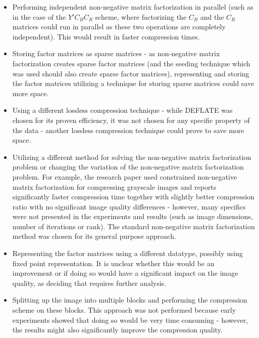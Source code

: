 \documentclass[thesis=M,english]{FITthesis}[2012/10/20]
\begin{document}
\begin{itemize}
  \item Performing independent non-negative matrix factorization in parallel
  (such as in the case of the $Y'C_BC_R$ scheme, where factorizing the $C_B$
  and the $C_R$ matrices could run in parallel as these two operations are
  completely independent). This would result in faster compression times.
  \item Storing factor matrices as sparse matrices - as non-negative matrix
  factorization creates sparse factor matrices (and the seeding technique
  which was used should also create sparse factor matrices), representing
  and storing the factor matrices utilizing a technique for storing sparse
  matrices could save more space.
  \item Using a different lossless compression technique - while DEFLATE was
  chosen for its proven efficiency, it was not chosen for any specific property
  of the data - another lossless compression technique could prove to save
  more space.
  \item Utilizing a different method for solving the non-negative matrix factorization
  problem or changing the variation of the non-negative matrix factorization problem.
  For example, the research paper \cite{imgcnmf} used constrained non-negative matrix factorization for
  compressing grayscale images and reports significantly faster compression time together with slightly
  better compression ratio with no significant image quality differences - however, many specifics
  were not presented in the experiments and results (such as image dimensions, number
  of iterations or rank). The standard non-negative matrix factorization method was
  chosen for its general purpose approach.
  \item Representing the factor matrices using a different datatype, possibly using fixed point
  representation. It is unclear whether this would be an improvement or if doing so would
  have a significant impact on the image quality, as deciding that requires further analysis.
  \item Splitting up the image into multiple blocks and performing the compression scheme on these
  blocks. This approach was not performed because early experiments showed that doing so would be very
  time consuming - however, the results might also significantly improve the compression quality.
\end{itemize}
\end{document}
